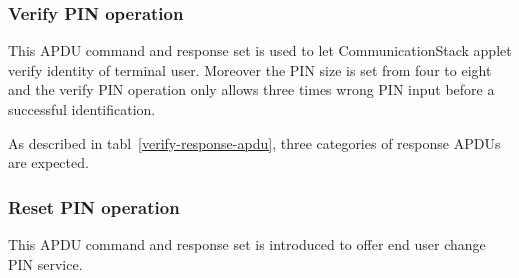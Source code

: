 \subsubsection{Verify PIN operation}
This APDU command and response set is used to let CommunicationStack applet verify identity of terminal user. Moreover the PIN size is set from four to eight and the verify PIN operation only allows three times wrong PIN input before a successful identification.

\begin{table}[!htbp]
\caption{Verify PIN command }
\label{verify-command-apdu}
\end{table}

As described in tabl~\ref{verify-response-apdu}, three categories of response APDUs are expected.

\begin{table}[!htbp]
\caption{Verify PIN response APDU}
\label{verify-response-apdu}
\end{table}

\subsubsection{Reset PIN operation}
This APDU command and response set is introduced to offer end user change PIN service.

\begin{table}[!htbp]
\caption{Reset PIN command }
\label{reset-pin-command-apdu}
\end{table}

